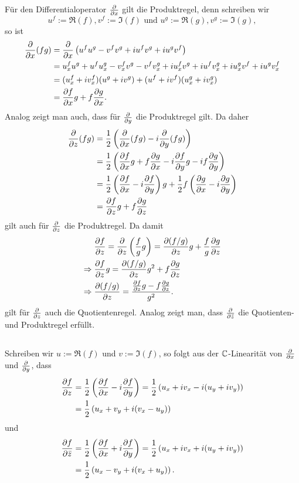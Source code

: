 \documentclass[a4paper,10pt]{article}
\begin{document}
Für den Differentialoperator $\frac{\partial }{\partial x}$ gilt die Produktregel, denn schreiben wir
\[
 u^f := \Re(f), v^f := \Im(f) \text{ und } u^g := \Re(g), v^g := \Im(g),
\]
so ist
\begin{align*}
 \frac{\partial }{\partial x}(fg)
 &= \frac{\partial }{\partial x}\left( u^f u^g - v^f v^g + i u^f v^g + i u^g v^f \right) \\
 &= u^f_x u^g + u^f u^g_x - v^f_x v^g - v^f v^g_x + i u^f_x v^g + i u^f v^g_x + i u^g_x v^f + i u^g v^f_x \\
 &= (u^f_x+iv^f_x)(u^g+iv^g) + (u^f+iv^f)(u^g_x+iv^g_x) \\
 &= \frac{\partial f}{\partial x}g + f\frac{\partial g}{\partial x}.
\end{align*}
Analog zeigt man auch, dass für $\frac{\partial }{\partial y}$ die Produktregel gilt. Da daher
\begin{align*}
 \frac{\partial }{\partial z}(fg)
 &= \frac{1}{2}\left( \frac{\partial }{\partial x}(fg) - i\frac{\partial }{\partial y}(fg) \right) \\
 &= \frac{1}{2}\left( \frac{\partial f}{\partial x}g + f\frac{\partial g}{\partial x} - i\frac{\partial f}{\partial y}g - if\frac{\partial g}{\partial y} \right) \\
 &= \frac{1}{2}\left( \frac{\partial f}{\partial x}-i\frac{\partial f}{\partial y} \right)g + \frac{1}{2}f\left( \frac{\partial g}{\partial x}-i\frac{\partial g}{\partial y} \right) \\
 &= \frac{\partial f}{\partial z}g + f\frac{\partial g}{\partial z}
\end{align*}
gilt auch für $\frac{\partial }{\partial z}$ die Produktregel. Da damit
\begin{align*}
 &\; \frac{\partial f}{\partial z} = \frac{\partial }{\partial z}\left(\frac{f}{g}g\right) = \frac{\partial (f/g)}{\partial z}g + \frac{f}{g}\frac{\partial g}{\partial z} \\
 \Rightarrow&\; \frac{\partial f}{\partial z}g = \frac{\partial (f/g)}{\partial z}g^2 + f\frac{\partial g}{\partial z} \\
 \Rightarrow&\; \frac{\partial (f/g)}{\partial z} = \frac{\frac{\partial f}{\partial z}g-f\frac{\partial g}{\partial z}}{g^2}.
\end{align*}
gilt für $\frac{\partial }{\partial z}$ auch die Quotientenregel. Analog zeigt man, dass $\frac{\partial }{\partial \bar{z}}$ die Quotienten- und Produktregel erfüllt.


\subsection{}
Schreiben wir $u := \Re(f)$ und $v := \Im(f)$, so folgt aus der $\mathbb{C}$-Linearität von $\frac{\partial }{\partial x}$ und $\frac{\partial }{\partial y}$, dass
\begin{equation}\label{eq: dfdz}
 \begin{aligned}
  \frac{\partial f}{\partial z}
  &= \frac{1}{2}\left( \frac{\partial f}{\partial x}-i\frac{\partial f}{\partial y} \right)
  = \frac{1}{2}\left( u_x+iv_x - i(u_y+iv_y) \right) \\
  &= \frac{1}{2}\left( u_x+v_y + i(v_x-u_y) \right)
 \end{aligned}
\end{equation}
und
\begin{equation}\label{eq: dfdkz}
 \begin{aligned}
  \frac{\partial f}{\partial \bar{z}}
  &= \frac{1}{2}\left( \frac{\partial f}{\partial x}+i\frac{\partial f}{\partial y} \right)
  = \frac{1}{2}\left( u_x+iv_x + i(u_y+iv_y) \right) \\
  &= \frac{1}{2}\left( u_x-v_y + i(v_x+u_y) \right).
 \end{aligned}
\end{equation}
\end{document}
